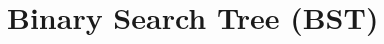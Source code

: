 \documentclass[../main.tex]{subfiles}
\begin{document}






\section{Binary Search Tree (BST)}
\end{document}
